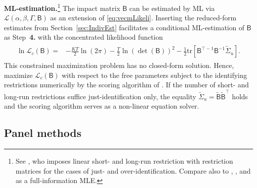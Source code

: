 \textbf{ML-estimation.}\footnote{See \citet{Vlaar2004}, who imposes linear short- and long-run restriction with restriction matrices for the cases of just- and over-identification. Compare also to \citet[Ch.~11, p.~331]{Hamilton1994}, \citet[Ch.~3.2, p.~84]{Lutkepohl2006}, and \citet[Ch.~11.2.2 and p.~315]{KilianLutkepohl2017} as a full-information MLE.} The impact matrix $ \mathsf{B} $ can be estimated by ML via $ \mathcal{L} \left(\alpha, \beta, \Gamma, \mathsf{B} \right) $ as an extension of \eqref{eq:vecmLikeli}. Inserting the reduced-form estimates from Section~\ref{sec:IndivEst} facilitates a conditional ML-estimation of $ \mathsf{B} $ as Step~\textbf{4.} with the concentrated likelihood function
\begin{align} \label{eq:svecmLikeli}
\begin{split}
	\ln \mathcal{L}_c \left( \mathsf{B} \right) = & - \frac{KT}{2} \ln \left( 2\pi \right) - \frac{T}{2} \ln \left( \det ( \mathsf{B} ) \right)^2 - \frac{1}{2} \text{tr} \left[ \mathsf{B}^{\top -1} \mathsf{B}^{-1} \widetilde{\Sigma}_u \right].
\end{split}
\end{align}
This constrained maximization problem has no closed-form solution. Hence, \cite{BreitungEtAl2004} maximize $ \mathcal{L}_c \left( \mathsf{B} \right) $ with respect to the free parameters subject to the identifying restrictions numerically by the scoring algorithm of \citet{AmisanoGiannini1997}. If the number of short- and long-run restrictions suffice just-identification only, the equality $ \widetilde{\Sigma}_u = \mathsf{\widetilde{B}} \mathsf{\widetilde{B}}^\top $ holds and the scoring algorithm serves as a non-linear equation solver.


\subsection{Panel methods} \label{sec:Panel}

